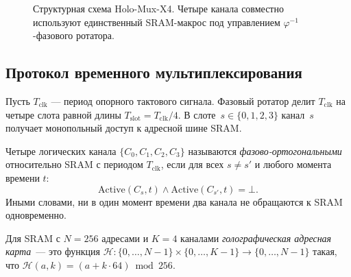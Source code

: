 \begin{figure}[ht]
\centering
\caption{Структурная схема Holo-Mux-X4.
  Четыре канала совместно используют единственный SRAM-макрос
  под управлением $\varphi^{-1}$-фазового ротатора.}
\label{fig:holo-mux-arch}
\end{figure}

\subsection{Протокол временного мультиплексирования}
\label{subsec:glava85-protocol}

Пусть $T_{\mathrm{clk}}$ — период опорного тактового сигнала.
Фазовый ротатор делит $T_{\mathrm{clk}}$ на четыре слота равной длины
$T_{\mathrm{slot}} = T_{\mathrm{clk}}/4$.
В слоте~$s \in \{0,1,2,3\}$ канал~$s$ получает монопольный доступ к
адресной шине SRAM.

\begin{definition}
\label{def:phase-orthogonality}
Четыре логических канала $\{C_0, C_1, C_2, C_3\}$ называются
\emph{фазово-ортогональными} относительно SRAM с периодом $T_{\mathrm{clk}}$,
если для всех $s \neq s'$ и любого момента времени $t$:
\[
  \mathrm{Active}(C_s, t) \wedge \mathrm{Active}(C_{s'}, t) = \bot.
\]
Иными словами, ни в один момент времени два канала не обращаются к SRAM
одновременно.
\end{definition}

\begin{definition}
\label{def:holographic-address-map}
Для SRAM с $N = 256$ адресами и $K = 4$ каналами
\emph{голографическая адресная карта}~— это функция
$\mathcal{H} : \{0,\ldots,N-1\} \times \{0,\ldots,K-1\} \to \{0,\ldots,N-1\}$
такая, что $\mathcal{H}(a, k) = (a + k \cdot 64) \bmod 256$.
\end{definition}

